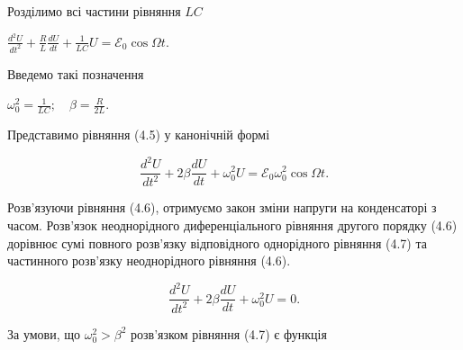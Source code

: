 \documentclass[12pt,a4paper]{article}
\begin{document}
    \vspace{0.5em}

    Розділимо всі частини рівняння $LC$

    \vspace{0.5em}

    \begin{center}
        $\displaystyle \frac{d^2U}{dt^2} + \frac{R}{L} \frac{dU}{dt} + \frac{1}{LC}U = \mathcal{E}_0 \cos \Omega t$.
    \end{center}

    \vspace{0.5em}

    Введемо такі позначення

    \vspace{0.5em}

    \begin{center}
        $\displaystyle \omega_0^2 = \frac{1}{LC}; \quad \beta = \frac{R}{2L}$.
    \end{center}

    Представимо рівняння (4.5) у канонічній формі

    \vspace{0.5em}

    \begin{equation}
        \frac{d^2U}{dt^2} + 2\beta \frac{dU}{dt} + \omega_0^2 U = \mathcal{E}_0 \omega_0^2 \cos \Omega t.
        \tag{4.6}
    \end{equation}

    \vspace{0.5em}

    Розв’язуючи рівняння (4.6), отримуємо закон зміни напруги на конденсаторі з часом. Розв’язок неоднорідного диференціального рівняння другого порядку (4.6) дорівнює сумі повного розв’язку відповідного однорідного рівняння (4.7) та частинного розв’язку неоднорідного
    рівняння (4.6).

    \vspace{0.5em}

    \begin{equation}
        \frac{d^2U}{dt^2} + 2 \beta \frac{dU}{dt} + \omega_0^2 U = 0.
        \tag{4.7}
    \end{equation}

    \vspace{0.5em}

    За умови, що $\omega_0^2 > \beta^2$ розв’язком рівняння (4.7) є функція

    \vspace{0.5em}
\end{document}
